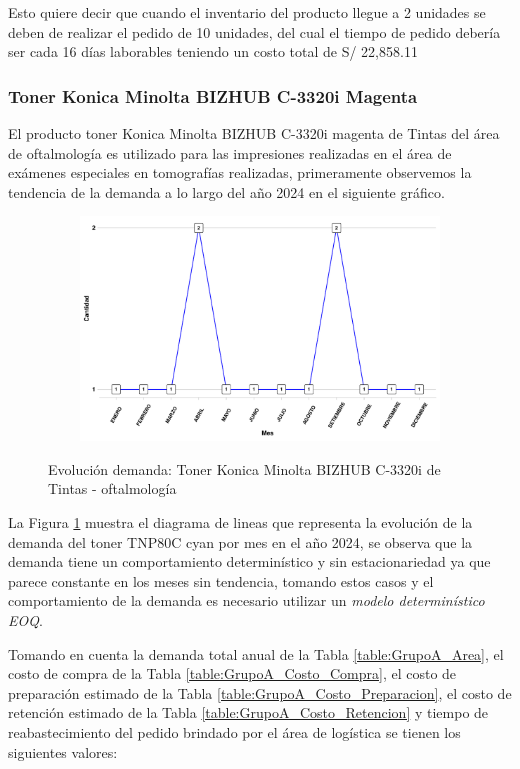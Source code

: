 Esto quiere decir que cuando el inventario del producto llegue a 2 unidades se deben de realizar el pedido de 10 unidades, del cual el tiempo de pedido debería ser cada 16 días laborables teniendo un costo total de S/ 22,858.11
\subsubsection{Toner Konica Minolta BIZHUB C-3320i Magenta}

El producto toner Konica Minolta BIZHUB C-3320i magenta de Tintas del área de oftalmología es utilizado para las impresiones realizadas en el área de exámenes especiales en tomografías realizadas, primeramente observemos la tendencia de la demanda a lo largo del año 2024 en el siguiente gráfico.
\clearpage
\begin{figure}[H]
  \caption{Evolución demanda: Toner Konica Minolta BIZHUB C-3320i de Tintas - oftalmología}
  {\includegraphics[width=15cm, height=5.95cm]{images/PROD014_demanda.pdf}}
  \label{fig:PROD014_demanda}
\end{figure}

La Figura \ref{fig:PROD014_demanda} muestra el diagrama de lineas que representa la evolución de la demanda del toner TNP80C cyan por mes en el año 2024, se observa que la demanda tiene un comportamiento determinístico y sin estacionariedad ya que parece constante en los meses sin tendencia, tomando estos casos y el comportamiento de la demanda es necesario utilizar un \textsl{modelo determinístico EOQ}.

Tomando en cuenta la demanda total anual de la Tabla \ref{table:GrupoA_Area}, el costo de compra de la Tabla \ref{table:GrupoA_Costo_Compra}, el costo de preparación estimado de la Tabla \ref{table:GrupoA_Costo_Preparacion}, el costo de retención estimado de la Tabla \ref{table:GrupoA_Costo_Retencion} y tiempo de reabastecimiento del pedido brindado por el área de logística se tienen los siguientes valores:

